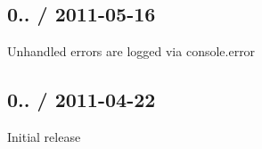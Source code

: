\subsection*{0.. / 2011-\/05-\/16}


\begin{DoxyItemize}
\item Unhandled errors are logged via console.\+error
\end{DoxyItemize}

\subsection*{0.. / 2011-\/04-\/22}


\begin{DoxyItemize}
\item Initial release 
\end{DoxyItemize}